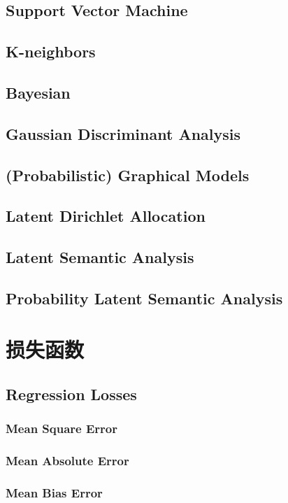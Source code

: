 \documentclass[oneside]{book}
\begin{document}
		\section{Support Vector Machine}
		\section{K-neighbors}
		\section{Bayesian}
		\section{Gaussian Discriminant Analysis}
		\section{(Probabilistic) Graphical Models}
		\section{Latent Dirichlet Allocation }
		\section{Latent Semantic Analysis }
		\section{Probability Latent Semantic Analysis }
		
	\chapter{损失函数}
		\section{Regression Losses}
			\subsection{Mean Square Error}
			\subsection{Mean Absolute Error}
			\subsection{Mean Bias Error}
\end{document}
